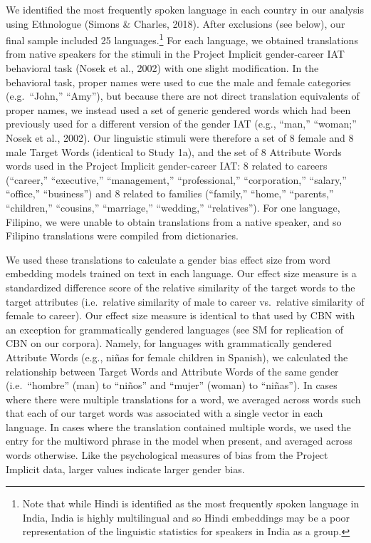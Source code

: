 \documentclass[man,floatsintext]{apa6}
\let\rmarkdownfootnote\footnote%
\def\footnote{\protect\rmarkdownfootnote}
\begin{document}
We identified the most frequently spoken language in each country in our analysis using Ethnologue (Simons \& Charles, 2018). After exclusions (see below), our final sample included 25 languages.\footnote{Note that while Hindi is identified as the most frequently spoken language in India, India is highly multilingual and so Hindi embeddings may be a poor representation of  the linguistic statistics for speakers in India as a group.} For each language, we obtained translations from native speakers for the stimuli in the Project Implicit gender-career IAT behavioral task (Nosek et al., 2002) with one slight modification. In the behavioral task, proper names were used to cue the male and female categories (e.g.~\enquote{John,} \enquote{Amy}), but because there are not direct translation equivalents of proper names, we instead used a set of generic gendered words which had been previously used for a different version of the gender IAT (e.g., ``man,'' ``woman;'' Nosek et al., 2002). Our linguistic stimuli were therefore a set of 8 female and 8 male Target Words (identical to Study 1a), and the set of 8 Attribute Words words used in the Project Implicit gender-career IAT: 8 related to careers (\enquote{career,} \enquote{executive,} \enquote{management,} \enquote{professional,} \enquote{corporation,} \enquote{salary,} \enquote{office,} \enquote{business}) and 8 related to families (\enquote{family,} \enquote{home,} \enquote{parents,} \enquote{children,} \enquote{cousins,} \enquote{marriage,} \enquote{wedding,} \enquote{relatives}). For one language, Filipino, we were unable to obtain translations from a native speaker, and so Filipino translations were compiled from dictionaries.

We used these translations to calculate a gender bias effect size from word embedding models trained on text in each language. Our effect size measure is a standardized difference score of the relative similarity of the target words to the target attributes (i.e.~relative similarity of male to career vs.~relative similarity of female to career). Our effect size measure is identical to that used by CBN with an exception for grammatically gendered languages (see SM for replication of CBN on our corpora). Namely, for languages with grammatically gendered Attribute Words (e.g., niñas for female children in Spanish), we calculated the relationship between Target Words and Attribute Words of the same gender (i.e.~\enquote{hombre} (man) to \enquote{niños} and \enquote{mujer} (woman) to \enquote{niñas}). In cases where there were multiple translations for a word, we averaged across words such that each of our target words was associated with a single vector in each language. In cases where the translation contained multiple words, we used the entry for the multiword phrase in the model when present, and averaged across words otherwise. Like the psychological measures of bias from the Project Implicit data, larger values indicate larger gender bias.
\end{document}
